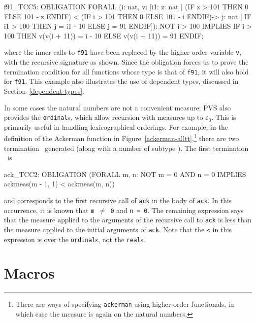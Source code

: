 \begin{session}
f91_TCC5: OBLIGATION
  FORALL (i: nat,
          v: [i1:
               \setb{}z: nat |
                        (IF z > 101 THEN 0 ELSE 101 - z ENDIF) <
                         (IF i > 101 THEN 0 ELSE 101 - i ENDIF)\sete ->
               \setb{}j: nat | IF i1 > 100 THEN j = i1 - 10 ELSE j = 91 ENDIF\sete]):
    NOT i > 100 IMPLIES
     IF i > 100 THEN v(v(i + 11)) = i - 10 ELSE v(v(i + 11)) = 91 ENDIF;
\end{session}
where the inner calls to \texttt{f91} have been replaced by the
higher-order variable \texttt{v}, with the recursive signature as shown.
Since the obligation forces us to prove the termination condition for all
functions whose type is that of \texttt{f91}, it will also hold for
\texttt{f91}.  This example also illustrates the use of dependent types,
discussed in Section~\ref{dependent-types}.


In some cases the natural numbers are not a convenient measure; PVS
also provides the \texttt{ordinal}s, which allow recursion with measures up
to $\varepsilon_0$.  This is primarily useful in handling
lexicographical orderings.  For example, in the definition of the
Ackerman function in Figure~\ref{ackerman-alltt},\footnote{There are
ways of specifying \texttt{ackerman} using higher-order functionals, in
which case the measure is again on the natural numbers.} there are two
termination \tccs\ generated (along with a number of subtype \tccs).
The first termination \tcc\ is
\begin{pvsex}
  ack_TCC2:
    OBLIGATION
      (FORALL m, n:
        NOT m = 0 AND n = 0 IMPLIES ackmeas(m - 1, 1) < ackmeas(m, n))
\end{pvsex}
%
and corresponds to the first recursive call of \texttt{ack} in the body of
\texttt{ack}.  In this occurrence, it is known that \texttt{m $\neq$ 0}
and \texttt{n = 0}.  The remaining expression says that the measure
applied to the arguments of the recursive call to \texttt{ack} is less
than the measure applied to the initial arguments of \texttt{ack}.  Note
that the \texttt{<} in this expression is over the \texttt{ordinal}s, not
the \texttt{real}s.



\section{Macros}\label{macro-declarations}

